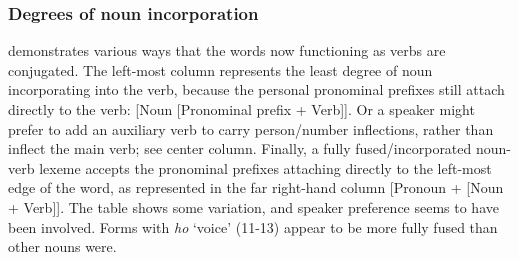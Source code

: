 \documentclass[output=paper]{LSP/langsci}
\begin{document}
\subsubsection{Degrees of  noun incorporation}
 demonstrates various ways that the words now functioning as  verbs are conjugated.  The left-most column represents the least degree of noun incorporating into the verb, because the personal pronominal prefixes still attach directly to the verb: [Noun [Pronominal prefix + Verb]]. Or a speaker might prefer to add an auxiliary verb to carry person/number inflections, rather than inflect the main verb; see center column. Finally, a fully fused/incorporated noun-verb lexeme accepts the pronominal prefixes attaching directly to the left-most edge of the word, as represented in the far right-hand column [Pronoun + [Noun + Verb]].  The table shows some variation, and speaker preference seems to have been involved. Forms with \textit{ho} `voice' (11-13) appear to be more fully fused than other nouns were.    
\end{document}
